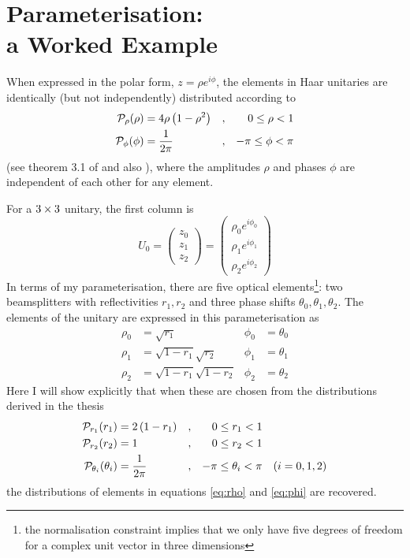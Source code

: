 \chapter[Parameterisation: a Worked Example]{Parameterisation:\\a Worked Example}
\label{app:example}

When expressed in the polar form, \(z=\rho e^{i\phi}\), the elements in Haar
unitaries are identically (but not independently) distributed according to
\begin{align}
  \label{eq:rho}
  \mathcal{P}_{\rho} \!\left(\rho\right) &= 4\rho\left(1-\rho^{2}\right) &,
    && 0 \leq \rho < 1 \\
  \label{eq:phi}
  \mathcal{P}_{\phi} \!\left(\phi\right) &= \frac{1}{2\pi} &, && -\pi \leq \phi < \pi
\end{align}
(see theorem 3.1 of \cite{reffy} and also \cite{haar-entries}),
where the amplitudes \(\rho\) and phases \(\phi\) are independent of each other
for any element.

For a \(3 \times 3\) unitary, the first column is
\begin{equation}
  U_{0} = \begin{pmatrix}
    z_{0} \\ z_{1} \\ z_{2}
  \end{pmatrix} = \begin{pmatrix}
    \rho_{0} e^{i \phi_{0}} \\
    \rho_{1} e^{i \phi_{1}} \\
    \rho_{2} e^{i \phi_{2}}
  \end{pmatrix}
\end{equation}
In terms of my parameterisation, there are five optical elements\footnote{the
normalisation constraint implies that we only have five degrees of freedom for a
complex unit vector in three dimensions}: two beamsplitters with reflectivities
\(r_{1}, r_{2}\) and three phase shifts \(\theta_{0}, \theta_{1}, \theta_{2}\).
The elements of the unitary are expressed in this parameterisation as
\begin{align}
  \rho_{0} &= \sqrt{r_{1}} & \phi_{0} &= \theta_{0} \\
  \rho_{1} &= \sqrt{1-r_{1}} \sqrt{r_{2}} & \phi_{1} &= \theta_{1} \\
  \rho_{2} &= \sqrt{1-r_{1}} \sqrt{1-r_{2}} & \phi_{2} &= \theta_{2}
\end{align}
Here I will show explicitly that when these are chosen from the distributions
derived in the thesis
\begin{align}
  \mathcal{P}_{r_{1}} \!\left(r_{1}\right) &= 2 \left( 1-r_{1} \right) &,
    && 0 \leq r_{1} < 1 \\
  \mathcal{P}_{r_{2}} \!\left(r_{2}\right) &= 1 &,
    && 0 \leq r_{2} < 1 \\
  \label{eq:theta}
  \mathcal{P}_{\theta_{i}} \!\left(\theta_{i}\right) &= \frac{1}{2 \pi} &,
    && -\pi \leq \theta_{i} < \pi && \left( i=0,1,2 \right)
\end{align}
the distributions of elements in equations \ref{eq:rho} and \ref{eq:phi} are
recovered.

